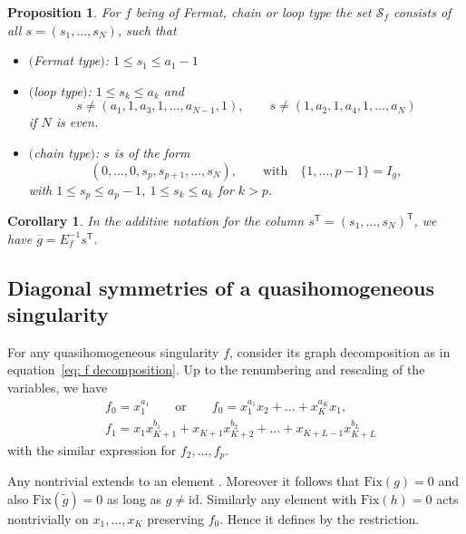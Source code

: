 \documentclass[10pt,a4paper]{article}
\numberwithin{equation}{section}
\newtheorem{Corollary}[Theorem]{Corollary}
\newtheorem{Proposition}[Theorem]{Proposition}
 { \theoremstyle{definition}
\newtheorem{Definition}[Theorem]{Definition}
\newtheorem{Note}[Theorem]{Note}
\newtheorem{Example}[Theorem]{Example}
\newtheorem{Remark}[Theorem]{Remark} }
\newcommand{\calS}{{\mathcal S}}
\newcommand{\Fix}{\mathrm{Fix}}
\newcommand{\id}{\mathrm{id}}
\begin{document}
\begin{Proposition}\label{proposition: chain loop group structure}
For $f$ being of Fermat, chain or loop type the set $\calS_f$ consists of all $s = (s_1,\dots,s_N)$, such that
	\begin{itemize}\itemsep=0pt
	 \item $($Fermat type$)$: $1 \le s_1 \le a_1-1$
	 \item $($loop type$)$: $1 \le s_k \le a_k$ and
	 \begin{equation*}\label{eq: vanishing r in loop}
		s \neq (a_1,1,a_3,1,\dots, a_{N-1},1), \qquad s \neq (1,a_2,1,a_4,1,\dots, a_{N})
	 \end{equation*}
	 if $N$ is even.
	 \item $($chain type$)$: $s$ is of the form
	 \begin{equation*}%
	 (0,\dots,0,s_p,s_{p+1},\dots,s_{N}), \qquad \text{with} \quad \{1,\dots,p-1\} = I_g,
	 \end{equation*}
	 with $1 \le s_{p} \le a_{p}-1$, $1 \le s_k \le a_k$ for $k > p$.
	\end{itemize}
\end{Proposition}

\begin{Corollary}
	In the additive notation for the column ${s^{\mathsf{T}} = (s_1,\dots,s_N)^{\mathsf{T}}}$, we have ${\overline g = E_f^{-1} s^{\mathsf{T}}}$\!.
\end{Corollary}

\subsection{Diagonal symmetries of a quasihomogeneous singularity}

For any quasihomogeneous singularity $f$, consider its graph decomposition as in equation~\eqref{eq: f decomposition}. Up to the renumbering and rescaling of the variables, we have
\begin{align*}
	& f_0 = x_1^{a_1} \qquad \text{or} \qquad f_0 = x_1^{a_1}x_2 + \dots + x_K^{a_K}x_1,
	\\
	& f_1 = x_1 x_{K+1}^{b_1} + x_{K+1}x_{K+2}^{b_2} + \dots + x_{K+L-1}x_{K+L}^{b_L}
\end{align*}
with the similar expression for $f_2, \dots, f_p$.

Any nontrivial  extends to an element . Moreover it follows that $\Fix(g) = 0$ and also $\Fix(\widetilde g) = 0$ as long as $g\ne\id$. Similarly any element  with $\Fix(h) = 0$ acts nontrivially on $x_1,\dots,x_K$ preserving $f_0$. Hence it defines  by the restriction.
\end{document}
